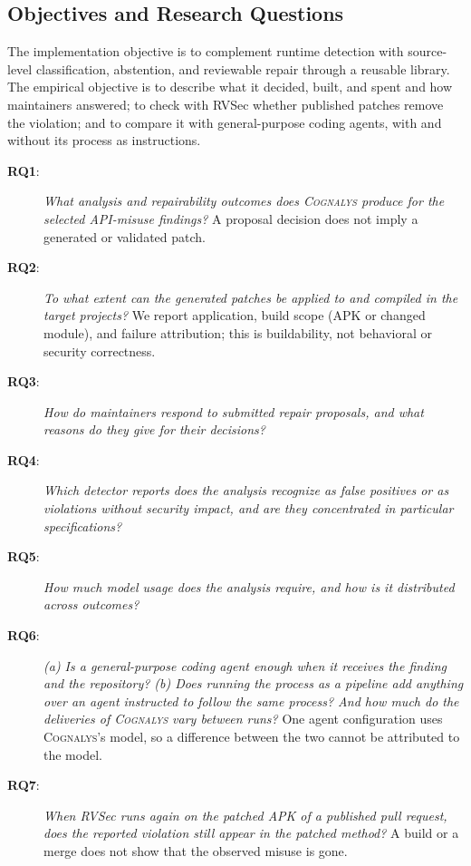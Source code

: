\documentclass[conference]{IEEEtran}
\newcommand{\system}{\textsc{Cognalys}}
\newcommand{\researchq}[1]{\textbf{RQ#1}}
\begin{document}
\subsection{Objectives and Research Questions}
\label{subsec:rqs}

The implementation objective is to complement runtime detection with
source-level classification, abstention, and reviewable repair through a
reusable library. The empirical objective is to describe what it decided,
built, and spent and how maintainers answered; to check with RVSec whether
published patches remove the violation; and to compare it with
general-purpose coding agents, with and without its process as instructions.

\begin{description}
  \item[\researchq{1}:] \emph{What analysis and repairability outcomes does
  {\system} produce for the selected API-misuse findings?}
  A proposal decision does not imply a generated or validated patch.

\item[\researchq{2}:] \emph{To what extent can the generated patches be
  applied to and compiled in the target projects?}
  We report application, build scope (APK or changed module), and failure
  attribution; this is buildability, not behavioral or security correctness.

  \item[\researchq{3}:] \emph{How do maintainers respond to submitted repair
  proposals, and what reasons do they give for their decisions?}

  \item[\researchq{4}:] \emph{Which detector reports does the analysis
  recognize as false positives or as violations without security impact,
  and are they concentrated in particular specifications?}

  \item[\researchq{5}:] \emph{How much model usage does the analysis
  require, and how is it distributed across outcomes?}

\item[\researchq{6}:] \emph{(a) Is a general-purpose coding agent enough when
  it receives the finding and the repository? (b) Does running the process as a
  pipeline add anything over an agent instructed to follow the same process?
  And how much do the deliveries of {\system} vary between runs?}
  One agent configuration uses {\system}'s model, so a difference between the
  two cannot be attributed to the model.

  \item[\researchq{7}:] \emph{When RVSec runs again on the patched APK of a
  published pull request, does the reported violation still appear in the
  patched method?}
  A build or a merge does not show that the observed misuse is gone.
\end{description}
\end{document}
